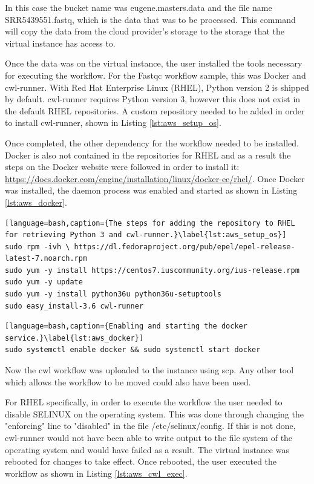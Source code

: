 In this case the bucket name was eugene.masters.data and the file name SRR5439551.fastq, which is the data that was to be processed. This command will copy the data from the cloud provider's storage to the storage that the virtual instance has access to.

Once the data was on the virtual instance, the user installed the tools necessary for executing the workflow. For the Fastqc workflow sample, this was Docker and cwl-runner. With Red Hat Enterprise Linux (RHEL), Python version 2 is shipped by default. cwl-runner requires Python version 3, however this does not exist in the default RHEL repositories. A custom repository needed to be added in order to install cwl-runner, shown in Listing \ref{lst:aws_setup_os}.

Once completed, the other dependency for the workflow needed to be installed. Docker is also not contained in the repositories for RHEL and as a result the steps on the Docker website were followed in order to install it: \url{https://docs.docker.com/engine/installation/linux/docker-ee/rhel/}. Once Docker was installed, the daemon process was enabled and started as shown in Listing \ref{lst:aws_docker}.

\begin{minipage}{\linewidth}
\begin{lstlisting}[language=bash,caption={The steps for adding the repository to RHEL for retrieving Python 3 and cwl-runner.}\label{lst:aws_setup_os}]
sudo rpm -ivh \ https://dl.fedoraproject.org/pub/epel/epel-release-latest-7.noarch.rpm
sudo yum -y install https://centos7.iuscommunity.org/ius-release.rpm
sudo yum -y update
sudo yum -y install python36u python36u-setuptools
sudo easy_install-3.6 cwl-runner
\end{lstlisting}
\end{minipage}

\begin{lstlisting}[language=bash,caption={Enabling and starting the docker service.}\label{lst:aws_docker}]
sudo systemctl enable docker && sudo systemctl start docker
\end{lstlisting}

Now the cwl workflow was uploaded to the instance using scp. Any other tool which allows the workflow to be moved could also have been used. 

For RHEL specifically, in order to execute the workflow the user needed to disable SELINUX on the operating system. This was done through changing the "enforcing" line to "disabled" in the file /etc/selinux/config. If this is not done, cwl-runner would not have been able to write output to the file system of the operating system and would have failed as a result. The virtual instance was rebooted for changes to take effect. Once rebooted, the user executed the workflow as shown in Listing \ref{lst:aws_cwl_exec}.

